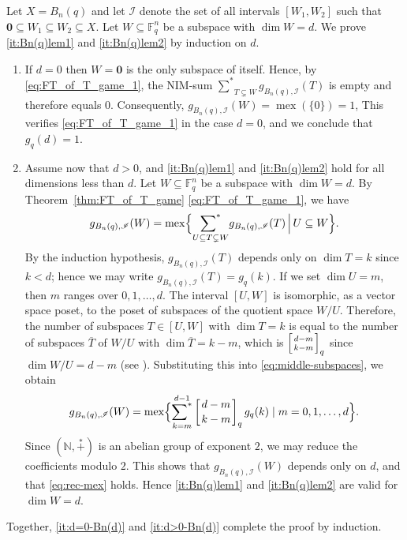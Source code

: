 \documentclass[a4paper,11pt]{amsart}
\theoremstyle{definition}
\newenvironment{demo}[1]{%
  \trivlist
  \item[\hskip\labelsep
        {\bf #1.}]
}{%
\hfill\qedsymbol
  \endtrivlist
}
\newcommand{\mex}{\operatorname{mex}}
\newcommand{\nimadd}{\overset{*}{+}}
\newcommand{\nimsum}{{\sum}^{*}}
\numberwithin{equation}{section}
\def\Non{\mathbb{N}}
\def\F{\mathbb{F}}
\def\I{\mathscr{I}}
\def\zero{\boldsymbol{0}}
\def\qbinom#1#2#3{\left[{{#1}\atop{#2}}\right]_{#3}}
\begin{document}
%
\begin{demo}{Proof}
%
Let $X=B_n(q)$ and let $\I$ denote the set of all intervals
$[W_{1},W_{2}]$ such that $\zero \subseteq W_{1} \subseteq W_{2} \subseteq X$.
Let $W\subseteq \F_{q}^{n}$ be a subspace with $\dim W=d$.
%
We prove \ref{it:Bn(q)lem1} and \ref{it:Bn(q)lem2} by induction on $d$.
\begin{enumerate}[label=(\roman*),leftmargin=2em]
%
\item\label{it:d=0-Bn(d)}
If $d=0$ then $W=\zero$ is the only subspace of itself.
Hence, by \eqref{eq:FT_of_T_game_1}, 
the NIM-sum ${\nimsum}_{T\subsetneq W}g_{B_{n}(q),\I}(T)$ is empty and therefore equals $0$.
Consequently, $g_{B_{n}(q),\I}(W)=\mex(\{0\})=1$,
This verifies \eqref{eq:FT_of_T_game_1} in the case $d=0$, 
and we conclude that $g_{q}(d)=1$.
%
\item\label{it:d>0-Bn(d)}
Assume now that $d>0$, and \ref{it:Bn(q)lem1} and \ref{it:Bn(q)lem2} hold for all dimensions less than $d$.
Let $W \subseteq \F_{q}^{n}$ be a subspace with $\dim W=d$.
By Theorem~\ref{thm:FT_of_T_game} \eqref{eq:FT_of_T_game_1},
we have 
\begin{equation}
g_{B_{n}(q),\I}(W)=\mex\Bigl\{
\underset{U\subseteq T\subsetneq W}{\nimsum}g_{B_{n}(q),\I}(T)
\,\Big|\,
U\subseteq W\Bigr\}.
\label{eq:middle-subspaces}
\end{equation}
%
By the induction hypothesis,
$g_{B_{n}(q),\I}(T)$ depends only on $\dim T=k$ since $k<d$;
hence we may write $g_{B_{n}(q),\I}(T)=g_{q}(k)$.
If we set $\dim U=m$,
then $m$ ranges over $0,1,\dots,d$.
%
The interval $[U,W]$ is isomorphic, as a vector space poset, to the poset of subspaces of the quotient space $W/U$.
Therefore, the number of subspaces $T\in[U,W]$ with $\dim T=k$ is equal to the number of subspaces $\overline T$ of $W/U$ with $\dim \overline T=k-m$,
which is $\qbinom{d-m}{k-m}{q}$ since $\dim W/U=d-m$
(see \cite{ec1}).
%
Substituting this into \eqref{eq:middle-subspaces}, we obtain
\[
g_{B_{n}(q),\I}(W)=\mex\Bigl\{ \overset{d-1}{\underset{k=m}{\nimsum}}\qbinom{d-m}{k-m}{q}g_{q}(k)\mid m=0,1,\dots,d\Bigr\}.
\]
Since $(\Non,\nimadd)$ is an abelian group of exponent $2$, we may reduce the coefficients modulo $2$.
This shows that $g_{B_{n}(q),\I}(W)$ depends only on $d$, and that \eqref{eq:rec-mex} holds.
Hence \ref{it:Bn(q)lem1} and \ref{it:Bn(q)lem2} are valid for $\dim W=d$.
%
\end{enumerate}
%
Together, \ref{it:d=0-Bn(d)} and \ref{it:d>0-Bn(d)} complete the proof by induction.
\end{demo}
%
%
\end{document}
